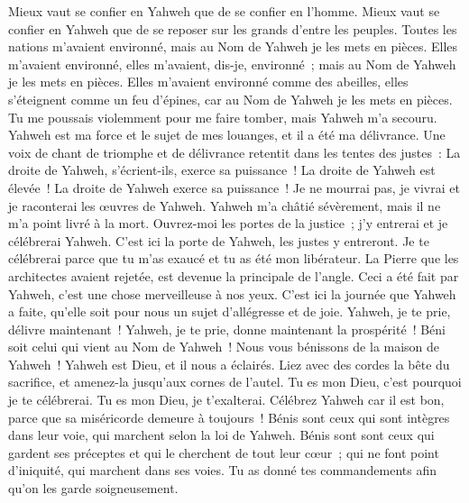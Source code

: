 \begin{multicols}{2}
Mieux vaut se confier en Yahweh que de se confier en l'homme.
Mieux vaut se confier en Yahweh que de se reposer sur les grands d'entre les peuples.
Toutes les nations m'avaient environné, mais au Nom de Yahweh je les mets en pièces.
Elles m'avaient environné, elles m'avaient, dis-je, environné~; mais au Nom de Yahweh je les mets en pièces.
Elles m'avaient environné comme des abeilles, elles s'éteignent comme un feu d'épines, car au Nom de Yahweh je les mets en pièces.
Tu me poussais violemment pour me faire tomber, mais Yahweh m'a secouru.
Yahweh est ma force et le sujet de mes louanges, et il a été ma délivrance.
Une voix de chant de triomphe et de délivrance retentit dans les tentes des justes~: La droite de Yahweh, s'écrient-ils, exerce sa puissance~!
La droite de Yahweh est élevée~! La droite de Yahweh exerce sa puissance~!
Je ne mourrai pas, je vivrai et je raconterai les œuvres de Yahweh.
Yahweh m'a châtié sévèrement, mais il ne m'a point livré à la mort.
Ouvrez-moi les portes de la justice~; j'y entrerai et je célébrerai Yahweh.
C'est ici la porte de Yahweh, les justes y entreront.
Je te célébrerai parce que tu m'as exaucé et tu as été mon libérateur.
La Pierre que les architectes avaient rejetée, est devenue la principale de l'angle.
Ceci a été fait par Yahweh, c'est une chose merveilleuse à nos yeux.
C'est ici la journée que Yahweh a faite, qu'elle soit pour nous un sujet d'allégresse et de joie.
Yahweh, je te prie, délivre maintenant~! Yahweh, je te prie, donne maintenant la prospérité~!
Béni soit celui qui vient au Nom de Yahweh~! Nous vous bénissons de la maison de Yahweh~!
Yahweh est Dieu, et il nous a éclairés. Liez avec des cordes la bête du sacrifice, et amenez-la jusqu'aux cornes de l'autel.
Tu es mon Dieu, c'est pourquoi je te célébrerai. Tu es mon Dieu, je t'exalterai.
Célébrez Yahweh car il est bon, parce que sa miséricorde demeure à toujours~!
\VerseOne{} Bénis sont ceux qui sont intègres dans leur voie, qui marchent selon la loi de Yahweh.
Bénis sont sont ceux qui gardent ses préceptes et qui le cherchent de tout leur cœur~;
qui ne font point d'iniquité, qui marchent dans ses voies.
Tu as donné tes commandements afin qu'on les garde soigneusement.

\end{multicols}
